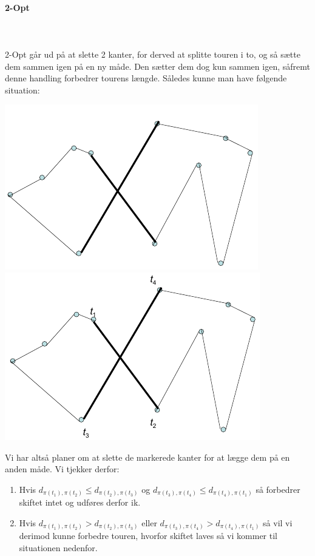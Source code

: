 \paragraph{2-Opt}
~\\
~\\
2-Opt går ud på at slette 2 kanter, for derved at splitte touren i to, og så sætte dem sammen igen på en ny måde. Den sætter dem dog kun sammen igen, såfremt denne handling forbedrer tourens længde. Således kunne man have følgende situation:
\begin{center}
 \includegraphics[bb=0 0 313 204,scale=0.5]{./2opt1.png}
 \includegraphics[bb=0 0 313 204,scale=0.5]{./2opt2.png}
\end{center}
Vi har altså planer om at slette de markerede kanter for at lægge dem på en anden måde. Vi tjekker derfor:
\begin{enumerate}
 \item Hvis $d_{\pi(t_1), \pi(t_2)} \leq d_{\pi(t_2), \pi(t_3)}$ og $d_{\pi(t_3), \pi(t_4)} \leq d_{\pi(t_4), \pi(t_1)}$ så forbedrer skiftet intet og udføres derfor ik.
 \item Hvis $d_{\pi(t_1), \pi(t_2)} > d_{\pi(t_2), \pi(t_3)}$ eller $d_{\pi(t_3), \pi(t_4)} > d_{\pi(t_4), \pi(t_1)}$ så vil vi derimod kunne forbedre touren, hvorfor skiftet laves så vi kommer til situationen nedenfor.
\end{enumerate}
